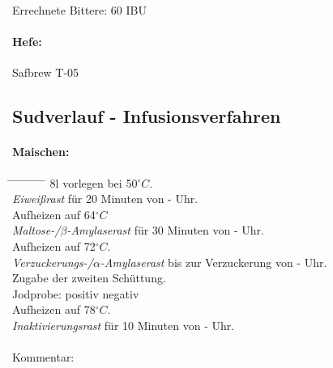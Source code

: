 \documentclass[12pt,oneside,a4paper]{scrartcl}
\begin{document}
\vspace{.25cm}
\hspace{1cm}Errechnete Bittere: 60 IBU
%
\paragraph{Hefe:}
	Safbrew T-05
%
\subsection*{Sudverlauf - Infusionsverfahren}	
%
\paragraph{Maischen:}
	\begin{tabbing}\hspace{1cm} \=
		\hspace{1cm} \= \hspace{1cm} \=\hspace{1cm} \=\hspace{1cm} \=\hspace{1cm} \= \hspace{1cm} \= \hspace{1cm} \= \hspace{1cm} \= \hspace{1cm} \= \kill
		\> 8l vorlegen bei 50$^\circ C$.\\
		\> \textit{Eiweißrast} für 20 Minuten von - Uhr.\\
		\> \> Aufheizen auf 64$^\circ C$\\
		\> \textit{Maltose-/$\beta$-Amylaserast} für 30 Minuten von - Uhr.\\
		\> \> Aufheizen auf 72$^\circ C$.\\
		\> \textit{Verzuckerungs-/$\alpha$-Amylaserast} bis zur Verzuckerung von - Uhr.\\
		\> \> Zugabe der zweiten Schüttung.\\
		\> \> \> Jodprobe: \> \> \Square positiv \> \> \Square negativ\\
		\> \> Aufheizen auf 78$^\circ C$.\\
		\> \textit{Inaktivierungsrast} für 10 Minuten von - Uhr.\\\\
		\> Kommentar: \>\>\>
	\end{tabbing}
%
\end{document}
